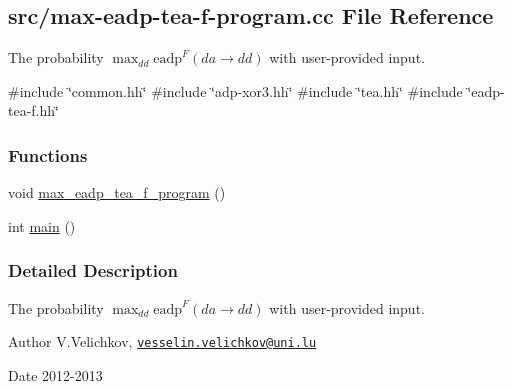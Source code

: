 \hypertarget{max-eadp-tea-f-program_8cc}{\subsection{src/max-\/eadp-\/tea-\/f-\/program.cc \-File \-Reference}
\label{max-eadp-tea-f-program_8cc}
}


\-The probability $\max_{dd} \mathrm{eadp}^{F}(da \rightarrow dd)$ with user-\/provided input.  


{\ttfamily \#include \char`\"{}common.\-hh\char`\"{}}\*
{\ttfamily \#include \char`\"{}adp-\/xor3.\-hh\char`\"{}}\*
{\ttfamily \#include \char`\"{}tea.\-hh\char`\"{}}\*
{\ttfamily \#include \char`\"{}eadp-\/tea-\/f.\-hh\char`\"{}}\*
\subsubsection*{\-Functions}
\begin{DoxyCompactItemize}
\item 
void \hyperlink{max-eadp-tea-f-program_8cc_a97ad3587de2525e8826a9fa0a864c7e9}{max\-\_\-eadp\-\_\-tea\-\_\-f\-\_\-program} ()
\item 
int \hyperlink{max-eadp-tea-f-program_8cc_ae66f6b31b5ad750f1fe042a706a4e3d4}{main} ()
\end{DoxyCompactItemize}


\subsubsection{\-Detailed \-Description}
\-The probability $\max_{dd} \mathrm{eadp}^{F}(da \rightarrow dd)$ with user-\/provided input. \begin{DoxyAuthor}{\-Author}
\-V.\-Velichkov, \href{mailto:vesselin.velichkov@uni.lu}{\tt vesselin.\-velichkov@uni.\-lu} 
\end{DoxyAuthor}
\begin{DoxyDate}{\-Date}
2012-\/2013 
\end{DoxyDate}


